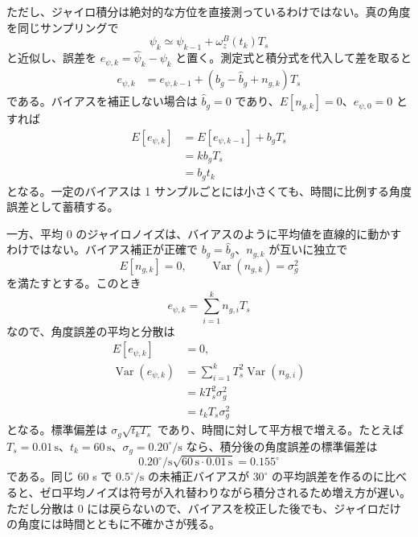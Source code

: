 ただし、ジャイロ積分は絶対的な方位を直接測っているわけではない。真の角度を同じサンプリングで
\begin{equation}
  \psi_k
  \simeq
  \psi_{k-1}+\omega_z^B(t_k)T_s
\end{equation}
と近似し、誤差を $e_{\psi,k}=\hat{\psi}_k-\psi_k$ と置く。測定式と積分式を代入して差を取ると
\begin{align}
  e_{\psi,k}
  &=
  e_{\psi,k-1}
  +
  \left(b_g-\hat{b}_g+n_{g,k}\right)T_s
\end{align}
である。バイアスを補正しない場合は $\hat{b}_g=0$ であり、$E[n_{g,k}]=0$、$e_{\psi,0}=0$ とすれば
\begin{align}
  E[e_{\psi,k}]
  &=
  E[e_{\psi,k-1}]+b_gT_s\\
  &=
  kb_gT_s\\
  &=
  b_g t_k
\end{align}
となる。一定のバイアスは 1 サンプルごとには小さくても、時間に比例する角度誤差として蓄積する。

一方、平均 0 のジャイロノイズは、バイアスのように平均値を直線的に動かすわけではない。バイアス補正が正確で $b_g=\hat{b}_g$、$n_{g,k}$ が互いに独立で
\begin{equation}
  E[n_{g,k}]=0,\qquad
  \operatorname{Var}(n_{g,k})=\sigma_g^2
\end{equation}
を満たすとする。このとき
\begin{equation}
  e_{\psi,k}
  =
  \sum_{i=1}^{k} n_{g,i}T_s
\end{equation}
なので、角度誤差の平均と分散は
\begin{align}
  E[e_{\psi,k}]&=0,\\
  \operatorname{Var}(e_{\psi,k})
  &=
  \sum_{i=1}^{k}T_s^2\operatorname{Var}(n_{g,i})\\
  &=
  kT_s^2\sigma_g^2\\
  &=
  t_kT_s\sigma_g^2
\end{align}
となる。標準偏差は $\sigma_g\sqrt{t_kT_s}$ であり、時間に対して平方根で増える。たとえば $T_s=0.01\,\mathrm{s}$、$t_k=60\,\mathrm{s}$、$\sigma_g=0.20^\circ/\mathrm{s}$ なら、積分後の角度誤差の標準偏差は
\begin{equation}
  0.20^\circ/\mathrm{s}\sqrt{60\,\mathrm{s}\cdot0.01\,\mathrm{s}}
  =
  0.155^\circ
\end{equation}
である。同じ 60 s で $0.5^\circ/\mathrm{s}$ の未補正バイアスが $30^\circ$ の平均誤差を作るのに比べると、ゼロ平均ノイズは符号が入れ替わりながら積分されるため増え方が遅い。ただし分散は 0 には戻らないので、バイアスを校正した後でも、ジャイロだけの角度には時間とともに不確かさが残る。

